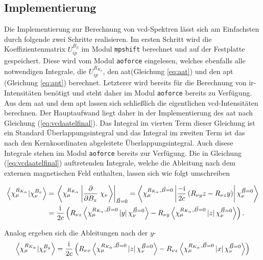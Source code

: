 	\subsection{Implementierung}
Die Implementierung zur Berechnung von \ac{vcd}-Spektren lässt sich am Einfachsten durch folgende zwei Schritte realisieren. Im ersten Schritt wird die Koeffizientenmatrix $U_{ip}^{B_\beta}$ im Modul \texttt{mpshift} berechnet und auf der Festplatte gespeichert. Diese wird vom Modul \texttt{aoforce} eingelesen, welches ebenfalls alle notwendigen Integrale, die $U_{ip}^{R_{K_\alpha}}$, den \ac{aat}(Gleichung \ref{eq:aat}) und den \ac{apt} (Gleichung \ref{eq:apt}) berechnet. Letzterer wird bereits für die Berechnung von \ac{ir}-Intensitäten benötigt und steht daher im Modul \texttt{aoforce} bereits zu Verfügung. Aus dem \ac{aat} und dem \ac{apt} lassen sich schließlich die eigentlichen \ac{vcd}-Intensitäten berechnen. Der Hauptaufwand liegt daher in der Implementierung des \ac{aat} nach Gleichung (\ref{eq:vcdaatelfinal}). Das Integral im vierten Term dieser Gleichung ist ein Standard Überlappungsintegral und das Integral im zweiten Term ist das nach den Kernkoordinaten abgeleitete Überlappungsintegral. Auch disese Integrale stehen im Modul \texttt{aoforce} bereits zur Verfügung.	Die in Gleichung (\ref{eq:vcdaatelfinal}) auftretenden Integrale, welche die Ableitung nach dem externen magnetischen Feld enthalten, lassen sich wie folgt umschreiben

	\begin{equation}\label{eq:ddipx}
	\begin{aligned}
	\left\langle\chi_\mu^{R_{K_\alpha}}\vert\chi_\nu^{B_x}\right\rangle&=\left.\left\langle\chi_\mu^{R_{K_\alpha}}\left|\frac{\partial}{\partial B_x}\right.\chi_\nu\right\rangle\right|_{\vec{B}=0}=\left\langle\chi_\mu^{R_{K_\alpha},\vec{B}=0}\left|\frac{-\mathrm{i}\mkern1mu}{2c}\left(R_{\nu y}z-R_{\nu z}y\right)\right|\chi_\nu^{\vec{B}=0}\right\rangle\\
	  &=\frac{\mathrm{i}\mkern1mu}{2c}\left(R_{\nu z}\left\langle\chi_\mu^{R_{K_\alpha},\vec{B}=0}\left|y\right|\chi_\nu^{\vec{B}=0}\right\rangle-R_{\nu y}\left\langle\chi_\mu^{R_{K_\alpha},\vec{B}=0}\left|z\right|\chi_\nu^{\vec{B}=0}\right\rangle\right).
	  \end{aligned}
	\end{equation}
	
	Analog ergeben sich die Ableitungen nach der $y$-
	\begin{equation} \label{eq:ddipy}
	\left\langle\chi_\mu^{R_{K_\alpha}}\vert\chi_\nu^{B_y}\right\rangle=\frac{\mathrm{i}\mkern1mu}{2c}\left(R_{\nu x}\left\langle\chi_\mu^{R_{K_\alpha},\vec{B}=0}\left|z\right|\chi_\nu^{\vec{B}=0}\right\rangle-R_{\nu z}\left\langle\chi_\mu^{R_{K_\alpha},\vec{B}=0}\left|x\right|\chi_\nu^{\vec{B}=0}\right\rangle\right)
	\end{equation}
	
